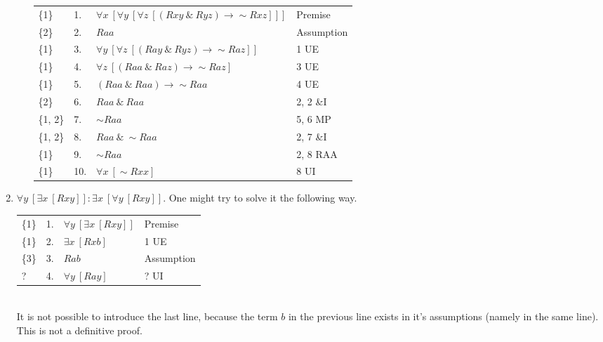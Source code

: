 \documentclass[a4paper,12pt]{article}
\newcommand{\ra}{\rightarrow}
\newcommand{\s}{\sim}
\newcommand{\ta}{ \ \& \ }
\newcommand{\all}{\forall}
\newcommand{\ex}{\exists}
\begin{document}
\begin{enumerate}[label=\arabic*,leftmargin=*]
\begin{enumerate}[label=(\roman*)]
\begin{minipage}{\textwidth}
                    \begin{tabular}{l l l l}
                        \{1\} & 1. & $\all x \ [\all y \ [\all z \ [(Rxy \ta Ryz) \ra \s Rxz]]]$ & Premise\\
                        \{2\} & 2. & $Raa$ & Assumption\\
                        \{1\} & 3. & $\all y \ [\all z \ [(Ray \ta Ryz) \ra \s Raz]]$ & 1 UE\\
                        \{1\} & 4. & $\all z \ [(Raa \ta Raz) \ra \s Raz]$ & 3 UE\\
                        \{1\} & 5. & $(Raa \ta Raa) \ra \s Raa$ & 4 UE\\
                        \{2\} & 6. & $Raa \ta Raa$ & 2, 2 \&I\\
                        \{1, 2\} & 7. & $\s Raa$ & 5, 6 MP\\
                        \{1, 2\} & 8. & $Raa \ta \s Raa$ & 2, 7 \&I\\
                        \{1\} & 9. & $\s Raa$ & 2, 8 RAA\\
                        \{1\} & 10. & $\all x \ [\s Rxx]$ & 8 UI\\
                    \end{tabular}
                    \vspace{1em}
                \end{minipage}
            \end{enumerate}

        \item $\all y \ [\ex x \ [Rxy]] : \ex x \ [\all y \ [Rxy]]$. One might try to solve it the following way.
            \nopagebreak
            \begin{minipage}{\textwidth}
            \vspace{1em}
            \begin{tabular}{l l l l}
                \{1\} & 1. & $\all y \ [\ex x \ [Rxy]]$ & Premise\\
                \{1\} & 2. & $\ex x \ [Rxb]$ & 1 UE\\
                \{3\} & 3. & $Rab$ & Assumption\\
                ? & 4. & $\all y \ [Ray]$ & ? UI\\
            \end{tabular}
            \vspace{1em}\\
            It is not possible to introduce the last line, because the term $b$ in the previous line exists in it's assumptions (namely in the same line).
            This is not a definitive proof.\\


\end{minipage}
\end{enumerate}
\end{document}
